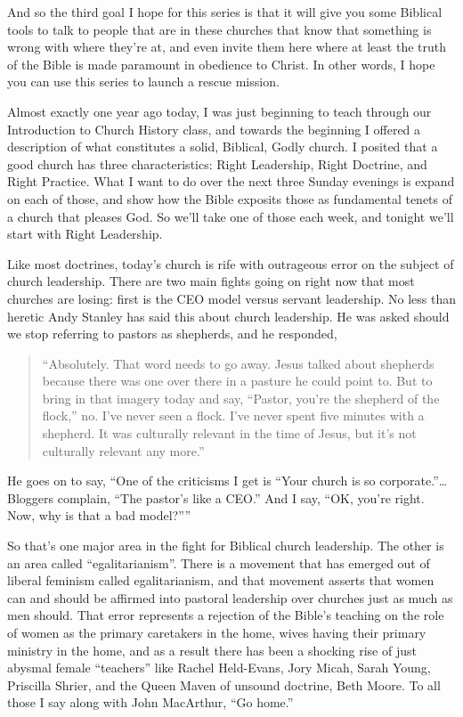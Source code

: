 \documentclass[letterpaper, 12pt]{article}
\begin{document}
    And so the third goal I hope for this series is that it will give
    you some Biblical tools to talk to people that are in these churches
    that know that something is wrong with where they're at, and even
    invite them here where at least the truth of the Bible is made
    paramount in obedience to Christ. In other words, I hope you can use
    this series to launch a rescue mission.
    
    Almost exactly one year ago today, I was just beginning to teach
    through our Introduction to Church History class, and towards the
    beginning I offered a description of what constitutes a solid,
    Biblical, Godly church. I posited that a good church has three
    characteristics: Right Leadership, Right Doctrine, and Right
    Practice. What I want to do over the next three Sunday evenings is
    expand on each of those, and show how the Bible exposits those as
    fundamental tenets of a church that pleases God. So we'll take one
    of those each week, and tonight we'll start with Right Leadership.

    Like most doctrines, today's church is rife with outrageous error on
    the subject of church leadership. There are two main fights going on
    right now that most churches are losing: first is the CEO model
    versus servant leadership. No less than heretic Andy Stanley has
    said this about church leadership. He was asked should we stop
    referring to pastors as shepherds, and he responded, 

    \begin{quote}

            ``Absolutely.  That word needs to go away. Jesus talked
            about shepherds because there was one over there in a
            pasture he could point to. But to bring in that imagery
            today and say, ``Pastor, you’re the shepherd of the flock,''
            no. I've never seen a flock. I've never spent five minutes
            with a shepherd. It was culturally relevant in the time of
            Jesus, but it's not culturally relevant any more.'' 

    \end{quote}

    He goes on to say, ``One of the criticisms I get is ``Your church is
    so corporate.''\ldots Bloggers complain, ``The pastor's like a
    CEO.'' And I say, ``OK, you’re right.  Now, why is that a bad
    model?''''

    So that's one major area in the fight for Biblical church
    leadership. The other is an area called ``egalitarianism''. There is
    a movement that has emerged out of liberal feminism called
    egalitarianism, and that movement asserts that women can and should
    be affirmed into pastoral leadership over churches just as much as
    men should. That error represents a rejection of the Bible's
    teaching on the role of women as the primary caretakers in the home,
    wives having their primary ministry in the home, and as a result
    there has been a shocking rise of just abysmal female ``teachers''
    like Rachel Held-Evans, Jory Micah, Sarah Young, Priscilla Shrier,
    and the Queen Maven of unsound doctrine, Beth Moore. To all those I
    say along with John MacArthur, ``Go home.''
\end{document}
